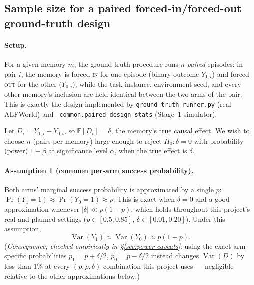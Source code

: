 %
%

\subsection{Sample size for a paired forced-in/forced-out ground-truth design}
\label{sec:power-derivation}

\paragraph{Setup.} For a given memory $m$, the ground-truth procedure runs
$n$ \emph{paired} episodes: in pair $i$, the memory is forced \textsc{in}
for one episode (binary outcome $Y_{1,i}$) and forced \textsc{out} for the
other ($Y_{0,i}$), while the task instance, environment seed, and every
other memory's inclusion are held identical between the two arms of the
pair. This is exactly the design implemented by
\texttt{ground\_truth\_runner.py} (real ALFWorld) and
\texttt{\_common.paired\_design\_stats} (Stage~1 simulator).

Let $D_i = Y_{1,i} - Y_{0,i}$, so $\mathbb{E}[D_i] = \delta$, the memory's
true causal effect. We wish to choose $n$ (pairs per memory) large enough
to reject $H_0\!:\delta=0$ with probability (power) $1-\beta$ at
significance level $\alpha$, when the true effect is $\delta$.

\paragraph{Assumption 1 (common per-arm success probability).} Both arms'
marginal success probability is approximated by a single $p$:
$\Pr(Y_1=1)\approx\Pr(Y_0=1)\approx p$. This is exact when $\delta=0$ and a
good approximation whenever $|\delta|\ll p(1-p)$, which holds throughout
this project's real and planned settings ($p\in[0.5,0.85]$,
$\delta\in[0.01,0.20]$). Under this assumption,
\[
  \operatorname{Var}(Y_1) \approx \operatorname{Var}(Y_0) \approx p(1-p).
\]
(\emph{Consequence, checked empirically in \S\ref{sec:power-caveats}}: using
the exact arm-specific probabilities $p_1=p+\delta/2$, $p_0=p-\delta/2$
instead changes $\operatorname{Var}(D)$ by less than 1\% at every
$(p,\rho,\delta)$ combination this project uses — negligible relative to
the other approximations below.)

